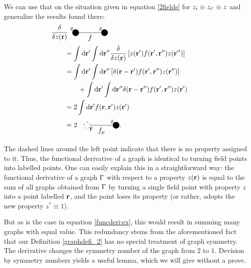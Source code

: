 \documentclass[8.5pt,twoside,twocolumn]{article}
\newcommand\di{\te{d}}
\newcommand\dr{\di\r}
\newcommand\zi{\enmat{z_i}}
\newcommand\zip{\enmat{z_{i'}}}
\renewcommand\r{\bo r}
\theoremstyle{standard}
\begin{document}
We can use that on the situation given in equation \eqref{2fields} for
$\zi\equiv\zip\equiv z$ and generalize the results found there:
\begin{equation} %
\begin{aligned}
&\hspace{-.7cm}\delti{}{z(\r)}\begin{tikzpicture}[baseline={(current bounding
box.center)}]%
  	\draw (0,0) node[circle,minimum size=0.2cm,draw,fill=black] (A) {};
  	\draw (1.5,0) node[circle,minimum size=0.2cm,draw,fill=black,align=center] (B) {};
  	\draw (A.east) -- node[below]{$f$} (B.west);
	\node [above left] at (A) {z};
	\node [above left] at (B) {z};
	\end{tikzpicture}\\
	&= \int \dr' \int \dr'' \delti{}{z(\r)} \lt[z(\r') f(\r',\r'') z(\r'')\rt]\\
&= \int \dr' \int \dr'' \lt[\dl(\r-\r') f(\r',\r'') z(\r'')\rt] \\
	&\qquad + \int \dr' \int \dr'' \dl(\r-\r'') f(\r',\r'') z(\r') \\
	&= 2 \int \dr' f(\r,\r') z(\r') \\
    &=2 \ \ \ \begin{tikzpicture}[baseline={(current bounding box.center)}]%
  	\draw (0,0) node[circle,minimum size=0.2cm,dashed,draw] (A) {};
  	\draw (1.5,0) node[circle,minimum size=0.2cm,draw,fill=black] (B) {};
  	\draw (A.east) -- node[below]{$f_\mu$} (B.west);
	\node [above left] at (B) {z};
	\node [below right] at (A) {\r};
	\end{tikzpicture}.
	\label{funcderi:ex}
\end{aligned}
\end{equation}

The dashed lines around the left point indicate that there is no property assigned to it.
Thus, the functional derivative of a graph is identical to turning field points
into labelled points. One can easily explain this in a straightforward way: the functional
derivative of a graph $\Gamma$ with respect to a property $z(\r)$ is equal to the sum of all graphs obtained
from $\Gamma$ by turning a single field point with property $z$ into a point labelled $\r$, and the
point loses its property (or rather, adopts the new property $z^* \equiv 1$).

But as is the case in equation \eqref{funcderi:ex}, this would result in summing many graphs with equal value.
This redundancy stems from the aforementioned fact that our Definition \ref{graphdefi_2} has no special
treatment of graph symmetry. The derivative changes the symmetry number of the graph from $2$ to $1$. Devision
by symmetry numbers yields a useful lemma, which we will give without a prove.
\end{document}
